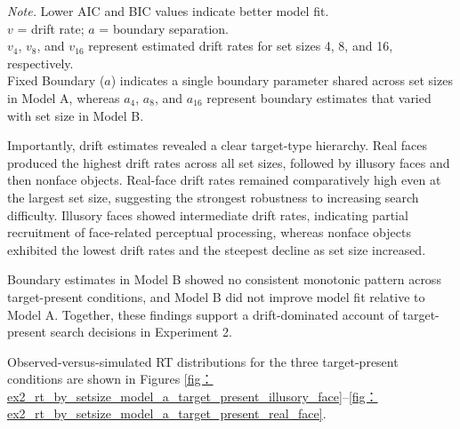\documentclass[stu,12pt,floatsintext]{apa7}
\begin{document}
\begin{table}[H]
\vspace{0.6em}


\vspace{0.4em}
{\footnotesize\textit{Note.} Lower AIC and BIC values indicate better model fit.\\
$v$ = drift rate; $a$ = boundary separation.\\
$v_{4}$, $v_{8}$, and $v_{16}$ represent estimated drift rates for set sizes 4, 8, and 16, respectively.\\
Fixed Boundary ($a$) indicates a single boundary parameter shared across set sizes in Model A, whereas $a_{4}$, $a_{8}$, and $a_{16}$ represent boundary estimates that varied with set size in Model B.}
\end{table}

Importantly, drift estimates revealed a clear target-type hierarchy. Real faces produced the highest drift rates across all set sizes, followed by illusory faces and then nonface objects. Real-face drift rates remained comparatively high even at the largest set size, suggesting the strongest robustness to increasing search difficulty. Illusory faces showed intermediate drift rates, indicating partial recruitment of face-related perceptual processing, whereas nonface objects exhibited the lowest drift rates and the steepest decline as set size increased.

Boundary estimates in Model B showed no consistent monotonic pattern across target-present conditions, and Model B did not improve model fit relative to Model A. Together, these findings support a drift-dominated account of target-present search decisions in Experiment 2.

Observed-versus-simulated RT distributions for the three target-present conditions are shown in Figures \ref{fig：ex2_rt_by_setsize_model_a_target_present_illusory_face}--\ref{fig：ex2_rt_by_setsize_model_a_target_present_real_face}.
\end{document}
